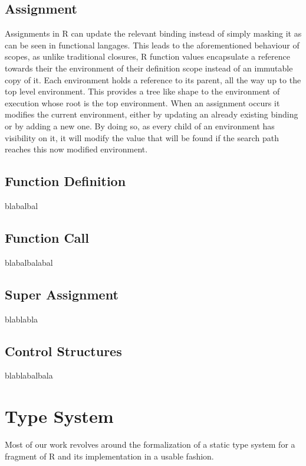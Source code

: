 \subsection{Assignment}

Assignments in R can update the relevant binding instead of simply masking it as can be seen in functional langages. This leads to the aforementioned behaviour of scopes, as unlike traditional closures, R function values encapsulate a reference towards their the environment of their definition scope instead of an immutable copy of it. Each environment holds a reference to its parent, all the way up to the top level environment. This provides a tree like shape to the environment of execution whose root is the top environment. When an assignment occurs it modifies the current environment, either by updating an already existing binding or by adding a new one. By doing so, as every child of an environment has visibility on it, it will modify the value that will be found if the search path reaches this now modified environment.

\subsection{Function Definition}

blabalbal

\subsection{Function Call}

blabalbalabal

\subsection{Super Assignment}

blablabla



\subsection{Control Structures}

blablabalbala





\section{Type System}

Most of our work revolves around the formalization of a static type system for a fragment of R and its implementation in a usable fashion.

